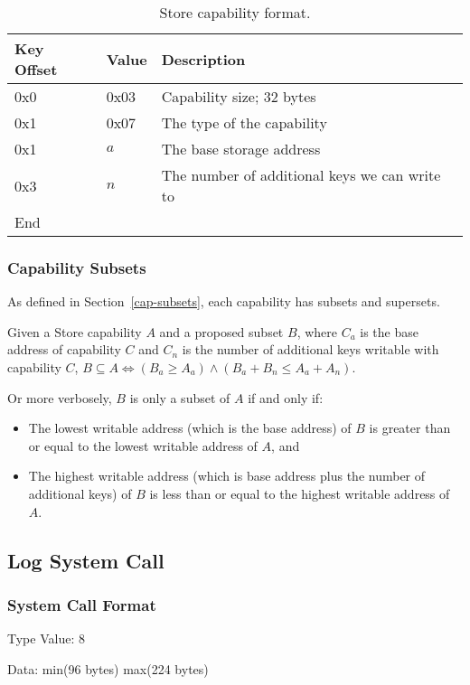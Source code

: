 \documentclass[english,a4paper]{article}
\let\oldparagraph\subsubsection
\renewcommand{\subsubsection}[1]{\oldparagraph{#1}\mbox{}}
\begin{document}
\begin{table}[H]
  \caption{Store capability format.}
  \centering{}%
  \begin{tabular}{l|l|p{}}
    \hline
    Key Offset & Value & Description\tabularnewline
    \hline
    \hline
    0x0 & 0x03 & Capability size; 32 bytes \tabularnewline
    0x1 & 0x07 & The type of the capability \tabularnewline
    0x1 & $a$ & The base storage address\tabularnewline
    0x3 & $n$ & The number of additional keys we can write to\tabularnewline
    \hline
    End &  \tabularnewline
    \hline
  \end{tabular}
\end{table}

\subsubsection{Capability Subsets}
As defined in Section~\ref{cap-subsets}, each capability has subsets and
supersets.

Given a Store capability $A$ and a proposed subset $B$, where $C_a$ is the base
address of capability $C$ and $C_n$ is the number of additional keys writable
with capability $C$, $B \subseteq A \iff \left(B_a \geq A_a\right) \land
\left(B_a + B_n \leq A_a + A_n\right)$.

Or more verbosely, $B$ is only a subset of $A$ if and only if:
\begin{itemize}
  \item The lowest writable address (which is the base address) of $B$ is
  greater than or equal to the lowest writable address of $A$, and
  \item The highest writable address (which is base address plus the number of
  additional keys) of $B$ is less than or equal to the highest writable address
  of $A$.
\end{itemize}

\subsection{Log System Call}

\subsubsection{System Call Format}
Type Value: 8

Data: min(96 bytes) max(224 bytes)
\end{document}
